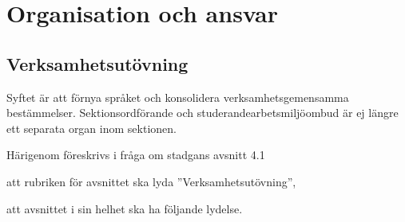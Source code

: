\documentclass{article}
\begin{document}
\section{Organisation och ansvar}
\subsection{Verksamhetsutövning}
Syftet är att förnya språket och konsolidera verksamhetsgemensamma bestämmelser.
Sektionsordförande och studerandearbetsmiljöombud är ej längre ett separata organ inom sektionen.

Härigenom föreskrivs i fråga om stadgans avsnitt 4.1
\begin{dels}
    \item att rubriken för avsnittet ska lyda ''Verksamhetsutövning'',
    \item att avsnittet i sin helhet ska ha följande lydelse.
\end{dels}
\end{document}
